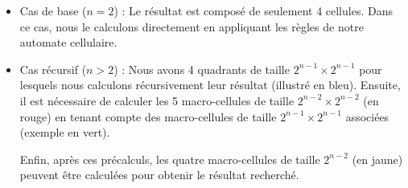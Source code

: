 \documentclass[12pt]{article}
\begin{document}
\begin{itemize}
    \item Cas de base ($n=2$) : Le résultat est composé de seulement 4 cellules. Dans ce cas, nous le calculons directement en appliquant les règles de notre automate cellulaire. \vspace{10px}

    \item Cas récursif ($n > 2$) : Nous avons 4 quadrants de taille $2^{n-1} \times 2^{n-1}$ pour lesquels nous calculons récursivement leur résultat (illustré en bleu). Ensuite, il est nécessaire de calculer les 5 macro-cellules de taille $2^{n-2} \times 2^{n-2}$ (en rouge) en tenant compte des macro-cellules de taille $2^{n-1} \times 2^{n-1}$ associées (exemple en vert).

    Enfin, après ces précalculs, les quatre macro-cellules de taille $2^{n-2}$ (en jaune) peuvent être calculées pour obtenir le résultat recherché.
\end{itemize}
 \vspace{10px}
\end{document}
